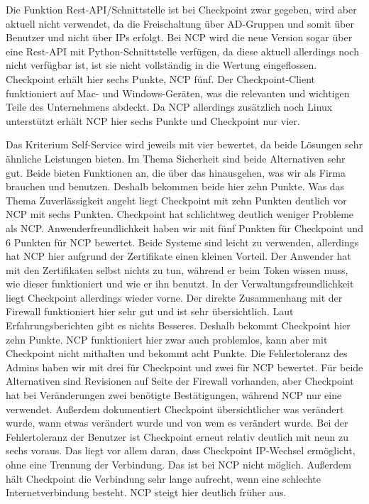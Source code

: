 Die Funktion Rest-API/Schnittstelle ist bei Checkpoint zwar gegeben, wird aber aktuell nicht verwendet, da die Freischaltung über AD-Gruppen und somit über Benutzer und nicht über IPs erfolgt. Bei NCP wird die neue Version sogar über eine Rest-API mit Python-Schnittstelle verfügen, da diese aktuell allerdings noch nicht verfügbar ist, ist sie nicht vollständig in die Wertung eingeflossen. Checkpoint erhält hier sechs Punkte, NCP fünf. Der Checkpoint-Client funktioniert auf Mac- und Windows-Geräten, was die relevanten und wichtigen Teile des Unternehmens abdeckt. Da NCP allerdings zusätzlich noch Linux unterstützt erhält NCP hier sechs Punkte und Checkpoint nur vier.

Das Kriterium Self-Service wird jeweils mit vier bewertet, da beide Lösungen sehr ähnliche Leistungen bieten. Im Thema Sicherheit sind beide Alternativen sehr gut. Beide bieten Funktionen an, die über das hinausgehen, was wir als Firma brauchen und benutzen. Deshalb bekommen beide hier zehn Punkte. Was das Thema Zuverlässigkeit angeht liegt Checkpoint mit zehn Punkten deutlich vor NCP mit sechs Punkten. Checkpoint hat schlichtweg deutlich weniger Probleme als NCP. Anwenderfreundlichkeit haben wir mit fünf Punkten für Checkpoint und 6 Punkten für NCP bewertet. Beide Systeme sind leicht zu verwenden, allerdings hat NCP hier aufgrund der Zertifikate einen kleinen Vorteil. Der Anwender hat mit den Zertifikaten selbst nichts zu tun, während er beim Token wissen muss, wie dieser funktioniert und wie er ihn benutzt. In der Verwaltungsfreundlichkeit liegt Checkpoint allerdings wieder vorne. Der direkte Zusammenhang mit der Firewall funktioniert hier sehr gut und ist sehr übersichtlich. Laut Erfahrungsberichten gibt es nichts Besseres. Deshalb bekommt Checkpoint hier zehn Punkte. NCP funktioniert hier zwar auch problemlos, kann aber mit Checkpoint nicht mithalten und bekommt acht Punkte. Die Fehlertoleranz des Admins haben wir mit drei für Checkpoint und zwei für NCP bewertet. Für beide Alternativen sind Revisionen auf Seite der Firewall vorhanden, aber Checkpoint hat bei Veränderungen zwei benötigte Bestätigungen, während NCP nur eine verwendet. Außerdem dokumentiert Checkpoint übersichtlicher was verändert wurde, wann etwas verändert wurde und von wem es verändert wurde. Bei der Fehlertoleranz der Benutzer ist Checkpoint erneut relativ deutlich mit neun zu sechs voraus. Das liegt vor allem daran, dass Checkpoint IP-Wechsel ermöglicht, ohne eine Trennung der Verbindung. Das ist bei NCP nicht möglich. Außerdem hält Checkpoint die Verbindung sehr lange aufrecht, wenn eine schlechte Internetverbindung besteht. NCP steigt hier deutlich früher aus.

